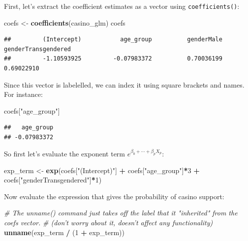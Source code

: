 \documentclass[
]{book}
\newenvironment{Shaded}{\begin{snugshade}}{\end{snugshade}}
\newcommand{\CommentTok}[1]{\textcolor[rgb]{0.56,0.35,0.01}{\textit{#1}}}
\newcommand{\DecValTok}[1]{\textcolor[rgb]{0.00,0.00,0.81}{#1}}
\newcommand{\KeywordTok}[1]{\textcolor[rgb]{0.13,0.29,0.53}{\textbf{#1}}}
\newcommand{\NormalTok}[1]{#1}
\newcommand{\OperatorTok}[1]{\textcolor[rgb]{0.81,0.36,0.00}{\textbf{#1}}}
\newcommand{\StringTok}[1]{\textcolor[rgb]{0.31,0.60,0.02}{#1}}
\begin{document}
First, let's extract the coefficient estimates as a vector using \texttt{coefficients()}:

\begin{Shaded}
\begin{Highlighting}[]
\NormalTok{coefs <-}\StringTok{ }\KeywordTok{coefficients}\NormalTok{(casino_glm)}
\NormalTok{coefs}
\end{Highlighting}
\end{Shaded}

\begin{verbatim}
##         (Intercept)           age_group          genderMale genderTransgendered 
##         -1.10593925         -0.07983372          0.70036199          0.69022910
\end{verbatim}

Since this vector is labelelled, we can index it using square brackets and names. For instance:

\begin{Shaded}
\begin{Highlighting}[]
\NormalTok{coefs[}\StringTok{"age_group"}\NormalTok{]}
\end{Highlighting}
\end{Shaded}

\begin{verbatim}
##   age_group 
## -0.07983372
\end{verbatim}

So first let's evaluate the exponent term \(e^{\beta_0 + \cdots + \beta_p X_p}\):

\begin{Shaded}
\begin{Highlighting}[]
\NormalTok{exp_term <-}\StringTok{ }\KeywordTok{exp}\NormalTok{(coefs[}\StringTok{"(Intercept)"}\NormalTok{] }\OperatorTok{+}\StringTok{ }\NormalTok{coefs[}\StringTok{"age_group"}\NormalTok{]}\OperatorTok{*}\DecValTok{3} \OperatorTok{+}\StringTok{ }\NormalTok{coefs[}\StringTok{"genderTransgendered"}\NormalTok{]}\OperatorTok{*}\DecValTok{1}\NormalTok{)}
\end{Highlighting}
\end{Shaded}

Now evaluate the expression that gives the probability of casino support:

\begin{Shaded}
\begin{Highlighting}[]
\CommentTok{# The unname() command just takes off the label that it "inherited" from the coefs vector.}
\CommentTok{# (don't worry about it, doesn't affect any functionality)}
\KeywordTok{unname}\NormalTok{(exp_term }\OperatorTok{/}\StringTok{ }\NormalTok{(}\DecValTok{1} \OperatorTok{+}\StringTok{ }\NormalTok{exp_term))}
\end{Highlighting}
\end{Shaded}
\end{document}
